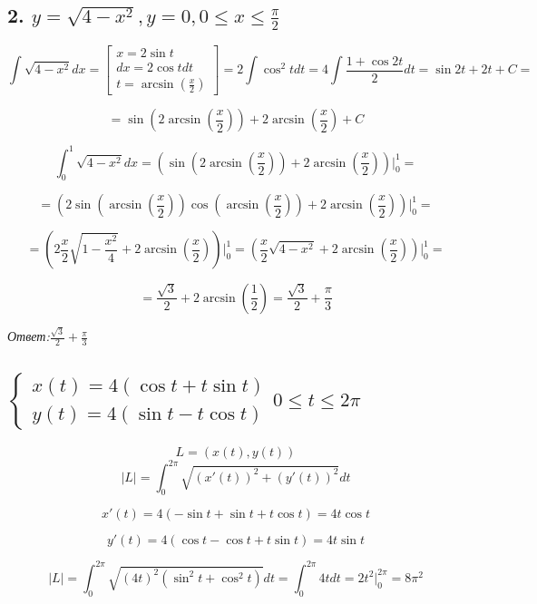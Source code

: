 \documentclass[a4paper]{article}
\begin{document}
\subsection*{2. $y = \sqrt{4-x^2}, y=0, 0 \leq x \leq \frac{\pi}{2}$}

\[ \int \sqrt{4-x^2} dx  = \begin{bmatrix}
x = 2\sin t \\ dx = 2 \cos t dt \\ t = \arcsin(\frac{x}{2})
\end{bmatrix} = 2 \int \cos^2 t dt = 4 \int \frac{1+\cos 2t}{2} dt = \sin 2t + 2t + C =
\] 

\[ = \sin \left( 2 \arcsin \left( \frac{x}{2}\right) \right) + 2 \arcsin \left( \frac{x}{2} \right) + C\]

\[\int_0^1 \sqrt{4-x^2} dx  =
\left( \sin \left( 2 \arcsin \left( \frac{x}{2}\right) \right) + 2 \arcsin \left( \frac{x}{2} \right) \right) \bigg|_0^1 = \]

\[ =  \left( 2 \sin \left( \arcsin \left( \frac{x}{2} \right) \right) \cos \left( \arcsin \left( \frac{x}{2}\right) \right) + 2 \arcsin \left( \frac{x}{2} \right) \right) \bigg|_0^1 = 
\]

\[
= \left( 2 \frac{x}{2} \sqrt{1-\frac{x^2}{4}} + 2 \arcsin \left( \frac{x}{2} \right) \right) \bigg|_0^1
= \left( \frac{x}{2} \sqrt{4-x^2} + 2 \arcsin \left( \frac{x}{2} \right) \right) \bigg|_0^1
=
\]

\[
=
\frac{\sqrt{3}}{2} + 2 \arcsin \left( \frac{1}{2} \right) = \frac{\sqrt{3}}{2} + \frac{\pi}{3}
\]

\textit{Ответ:$\frac{\sqrt{3}}{2} + \frac{\pi}{3}$}

\subsection*{$\begin{cases} x(t) = 4( \cos t + t \sin t) \\ y(t) = 4 ( \sin t - t \cos t) \end{cases} 0 \leq t \leq 2 \pi$}

\[L = \left( x(t), y(t) \right)\]
\[|L| = \int_0^{2 \pi} \sqrt{(x'(t))^2 + (y'(t))^2} dt\]


\[ x'(t) = 4(- \sin t + \sin t + t \cos t) = 4 t \cos t\]

\[ y'(t) = 4(\cos t - \cos t + t \sin t) = 4 t \sin t\]

\[ |L| = \int_0^{2 \pi} \sqrt{(4t)^2 (\sin^2 t + \cos^2 t)} dt = \int _0^{2 \pi} 4t dt = 2t^2 \bigg|_0^{2 \pi} = 8 \pi^2 \]
\end{document}
